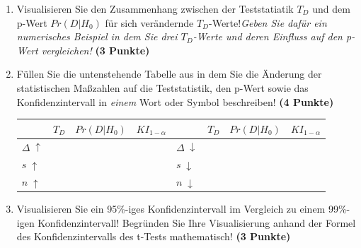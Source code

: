 \documentclass[a4paper, 9pt]{scrartcl}\usepackage[]{graphicx}\usepackage[]{xcolor}
\begin{document}
\begin{enumerate}
\item Visualisieren Sie den Zusammenhang zwischen der Teststatiatik $T_{D}$ und dem p-Wert $Pr(D|H_0)$ für sich verändernde $T_{D}$-Werte!\textit{Geben Sie dafür ein numerisches Beispiel in dem Sie drei $T_{D}$-Werte und deren Einfluss auf den p-Wert vergleichen!} \textbf{(3 Punkte)}  
\item  Füllen Sie die untenstehende Tabelle aus in dem Sie die Änderung der statistischen Maßzahlen auf die Teststatistik, den p-Wert sowie das Konfidenzintervall in \textit{einem} Wort oder Symbol beschreiben! \textbf{(4 Punkte)}
\begin{center}
  \large
  \begin{tabular}[c]{l|c|c|c|l|c|c|c}
    & $T_{D}$ & $Pr(D|H_0)$ & $KI_{1-\alpha}$ & & $T_{D}$ & $Pr(D|H_0)$ & $KI_{1-\alpha}$\strut\\ 
    \hline
    \textbf{$\Delta\; \uparrow$} & \hspace{1.8cm} & \hspace{1.8cm}  & \hspace{1.8cm} & \textbf{
                                                          $\Delta\; \downarrow$} &
                                                                          \hspace{1.8cm} & \hspace{1.8cm}  & \hspace{1.8cm}\strut\\
    \hline
        \textbf{$s\; \uparrow$} & \hspace{1.8cm} & \hspace{1.8cm}  & \hspace{1.8cm} & \textbf{
                                                          $s\; \downarrow$} &
                                                                          \hspace{1.8cm}
                                                & \hspace{1.8cm}  & \hspace{1.8cm}\strut\\
    \hline
        \textbf{$n\; \uparrow$} & \hspace{1.8cm} & \hspace{1.8cm}  & \hspace{1.8cm} & \textbf{
                                                          $n\; \downarrow$} &
                                                                          \hspace{1.8cm}
                                                & \hspace{1.8cm}  & \hspace{1.8cm}\strut\\
    \hline
  \end{tabular}
\end{center}
\item Visualisieren Sie ein 95\%-iges Konfidenzintervall im Vergleich zu einem 99\%-igen Konfidenzintervall! Begründen Sie Ihre Visualisierung anhand der Formel des Konfidenzintervalls des t-Tests mathematisch! \textbf{(3 Punkte)} 
\end{enumerate} 
\clearpage
\end{document}
